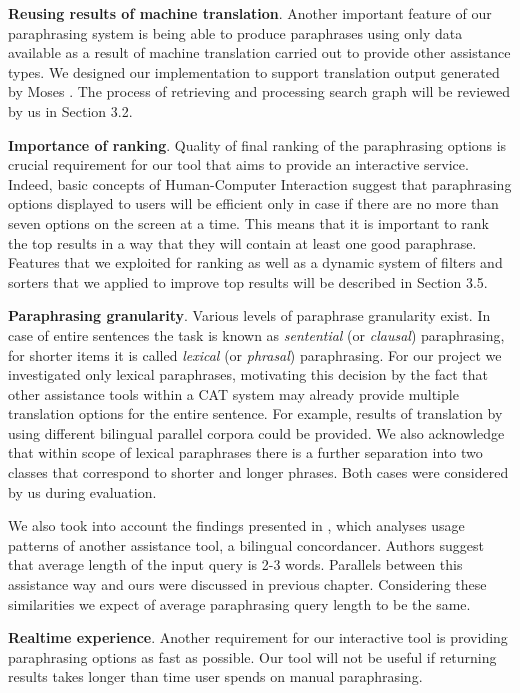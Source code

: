 \textbf{Reusing results of machine translation}. Another important feature of our paraphrasing system is being able to produce paraphrases using only data available as a result of machine translation carried out to provide other assistance types. We designed our implementation to support translation output generated by Moses \citep{koehn2007moses}. The process of retrieving and processing search graph will be reviewed by us in Section 3.2.

\textbf{Importance of ranking}. Quality of final ranking of the paraphrasing options is crucial requirement for our tool that aims to provide an interactive service. Indeed, basic concepts of Human-Computer Interaction suggest that paraphrasing options displayed to users will be efficient only in case if there are no more than seven options on the screen at a time. This means that it is important to rank the top results in a way that they will contain at least one good paraphrase. Features that we exploited for ranking as well as a dynamic system of filters and sorters that we applied to improve top results will be described in Section 3.5.  

\textbf{Paraphrasing granularity}. Various levels of paraphrase granularity exist. In case of entire sentences the task is known as \textit{sentential} (or \textit{clausal}) paraphrasing, for shorter items it is called \textit{lexical} (or \textit{phrasal}) paraphrasing. For our project we investigated only lexical paraphrases, motivating this decision by the fact that other assistance tools within a CAT system may already provide multiple translation options for the entire sentence. For example, results of translation by using different bilingual parallel corpora could be provided. We also acknowledge that within scope of lexical paraphrases there is a further separation into two classes that correspond to shorter and longer phrases. Both cases were considered by us during evaluation.

We also took into account the findings presented in \cite{simard2005studying}, which analyses usage patterns of another assistance tool, a bilingual concordancer. Authors suggest that average length of the input query is 2-3 words. Parallels between this assistance way and ours were discussed in previous chapter. Considering these similarities we expect of average paraphrasing query length to be the same.

\textbf{Realtime experience}. Another requirement for our interactive tool is providing paraphrasing options as fast as possible. Our tool will not be useful if returning results takes longer than time user spends on manual paraphrasing. 


